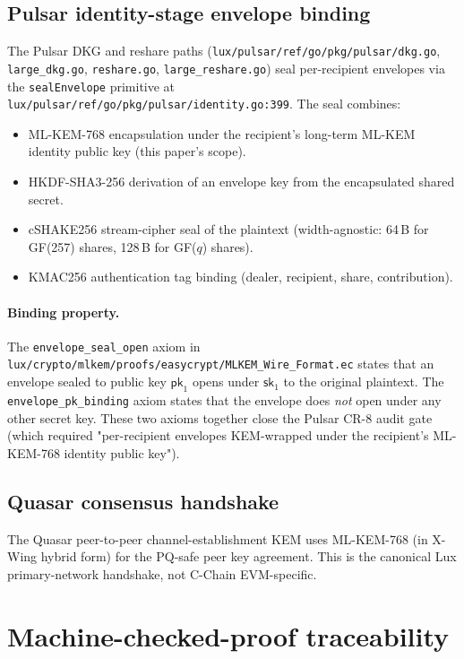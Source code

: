 \documentclass[11pt,a4paper]{article}
\begin{document}
\subsection{Pulsar identity-stage envelope binding}

The Pulsar DKG and reshare paths
(\texttt{lux/pulsar/ref/go/pkg/pulsar/dkg.go},
\texttt{large\_dkg.go}, \texttt{reshare.go},
\texttt{large\_reshare.go}) seal per-recipient envelopes via the
\texttt{sealEnvelope} primitive at
\texttt{lux/pulsar/ref/go/pkg/pulsar/identity.go:399}. The seal
combines:

\begin{itemize}
\item ML-KEM-768 encapsulation under the recipient's long-term
  ML-KEM identity public key (this paper's scope).
\item HKDF-SHA3-256 derivation of an envelope key from the
  encapsulated shared secret.
\item cSHAKE256 stream-cipher seal of the plaintext (width-agnostic:
  64\,B for GF(257) shares, 128\,B for GF($q$) shares).
\item KMAC256 authentication tag binding (dealer, recipient,
  share, contribution).
\end{itemize}

\paragraph{Binding property.} The \texttt{envelope\_seal\_open}
axiom in
\texttt{lux/crypto/mlkem/proofs/easycrypt/MLKEM\_Wire\_Format.ec}
states that an envelope sealed to public key $\mathsf{pk}_1$ opens
under $\mathsf{sk}_1$ to the original plaintext. The
\texttt{envelope\_pk\_binding} axiom states that the envelope does
\emph{not} open under any other secret key. These two axioms
together close the Pulsar CR-8 audit gate (which required
"per-recipient envelopes KEM-wrapped under the recipient's
ML-KEM-768 identity public key").

\subsection{Quasar consensus handshake}

The Quasar peer-to-peer channel-establishment KEM uses ML-KEM-768
(in X-Wing hybrid form) for the PQ-safe peer key agreement. This
is the canonical Lux primary-network handshake, not C-Chain
EVM-specific.

\section{Machine-checked-proof traceability}
\label{sec:traceability}
\end{document}
